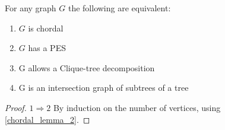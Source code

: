 \begin{theorem}
	For any graph $G$ the following are equivalent:
	\begin{enumerate}
		\item $G$ is chordal
		\item $G$ has a PES
		\item G allows a Clique-tree decomposition
		\item G is an intersection graph of subtrees of a tree
	\end{enumerate}
\end{theorem}
\begin{proof}
	$1 \Rightarrow 2$ By induction on the number of vertices, using \cref{chordal_lemma_2}.

\end{proof}
